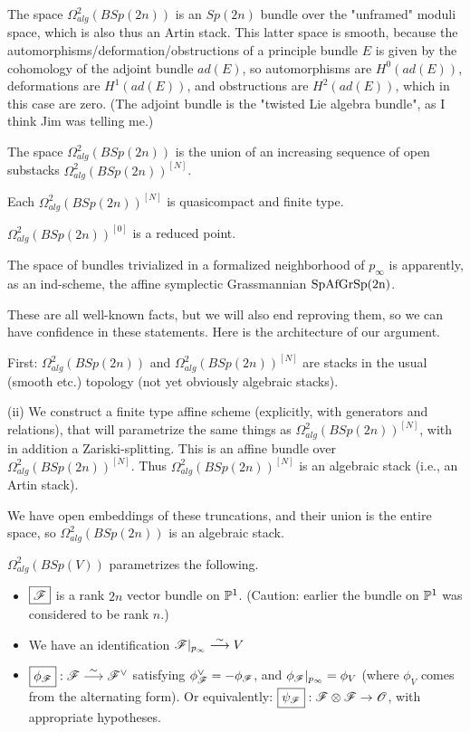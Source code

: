{ The space 
$\Omega^2_{alg}(BSp(2n))$ is an $Sp(2n)$ bundle over the "unframed" moduli space, which is also thus an Artin stack.  This latter space is smooth, because the automorphisms/deformation/obstructions of a principle bundle $E$ is given by the cohomology of the adjoint bundle $ad(E)$, so automorphisms are $H^0(ad(E))$, deformations are $H^1(ad(E))$, and obstructions are $H^2(ad(E))$, which in this case are zero.  (The adjoint bundle is the "twisted Lie algebra bundle", as I think Jim was telling me.)



The space 
$\Omega^2_{alg}(BSp(2n))$  is the union of an increasing sequence of open substacks
$\Omega^2_{alg}(BSp(2n))^{[N]}$.

Each $\Omega^2_{alg}(BSp(2n))^{[N]}$ is quasicompact and finite type.  

$\Omega^2_{alg}(BSp(2n))^{[0]}$ is a reduced point.

The space of  bundles trivialized in a formalized neighborhood of $p_\infty$ is apparently, as an ind-scheme, the affine symplectic Grassmannian $\rm{SpAfGr}{Sp(2n)}$.

These are all well-known facts, but we will also end reproving them, so we can have confidence in these statements.  Here is the architecture of our argument.

First:
$\Omega^2_{alg}(BSp(2n))$ and $\Omega^2_{alg}(BSp(2n))^{[N]}$
are stacks in the usual (smooth etc.) topology (not yet obviously algebraic stacks).  

(ii) 
We construct a finite type affine scheme (explicitly, with generators and relations), that will parametrize the same things as  $\Omega^2_{alg}(BSp(2n))^{[N]}$, with in addition a Zariski-splitting.  This is an affine bundle  over $\Omega^2_{alg}(BSp(2n))^{[N]}$.  Thus $\Omega^2_{alg}(BSp(2n))^{[N]}$ is an algebraic stack (i.e., an Artin stack).

We  have open embeddings of these truncations, and their union is  the entire space, so $\Omega^2_{alg}(BSp(2n))$ is an algebraic stack.




$\Omega^2_{alg}(B Sp(V))$ parametrizes the following.

\begin{itemize}
\item $\boxed{{\mathscr{F}}}$ is a rank $2n$ vector bundle on $\mathbb P^1$.  (Caution:  earlier the bundle on $\mathbb P^1$ was considered to be rank $n$.)
\item  We have an identification ${\mathscr{F}}|_{p_{\infty}} \overset \sim \longrightarrow V$
\item $\boxed{\phi_{\mathscr{F}}}: {\mathscr{F}} \overset \sim \longrightarrow {\mathscr{F}}^\vee$ satisfying 
$\phi^\vee_{\mathscr{F}} = -\phi_{\mathscr{F}}$, and $\phi_{{\mathscr{F}}}|_{p_\infty} = \phi_V$ (where $\phi_V$ comes
from the alternating form).    Or equivalently:  $\boxed{\psi_{{\mathscr{F}}}}: {\mathscr{F}}\otimes {\mathscr{F}} \rightarrow {\mathscr{O}}$,
with appropriate hypotheses.
\end{itemize}


}
